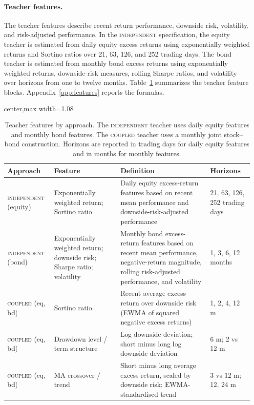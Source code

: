 \documentclass[10pt]{article}
\newcommand{\Acoup}{\textsc{coupled}}
\newcommand{\Bindep}{\textsc{independent}}
\begin{document}
\paragraph{Teacher features.}
The teacher features describe recent return performance, downside risk, volatility, and risk-adjusted performance. In the \Bindep{} specification, the equity teacher is estimated from daily equity excess returns using exponentially weighted returns and Sortino ratios over 21, 63, 126, and 252 trading days. The bond teacher is estimated from monthly bond excess returns using exponentially weighted returns, downside-risk measures, rolling Sharpe ratios, and volatility over horizons from one to twelve months. Table~\ref{tab:teacher-features} summarizes the teacher feature blocks. Appendix~\ref{app:features} reports the formulas.

\begin{table}[H]
\centering
\caption{Teacher features by approach. The \Bindep{} teacher uses daily equity features and monthly bond features. The \Acoup{} teacher uses a monthly joint stock--bond construction. Horizons are reported in trading days for daily equity features and in months for monthly features.}
\label{tab:teacher-features}
\small
\begin{adjustbox}{center,max width=1.08\textwidth}
\begin{tabular}{p{2.1cm}p{2.3cm}p{6.4cm}p{3.0cm}}
\toprule
Approach & Feature & Definition & Horizons \\
\midrule
\Bindep{} (equity) & Exponentially weighted return; Sortino ratio & Daily equity excess-return features based on recent mean performance and downside-risk-adjusted performance & 21, 63, 126, 252 trading days \\
\Bindep{} (bond) & Exponentially weighted return; downside risk; Sharpe ratio; volatility & Monthly bond excess-return features based on recent mean performance, negative-return magnitude, rolling risk-adjusted performance, and volatility & 1, 3, 6, 12 months \\
\midrule
\Acoup{} (eq, bd) & Sortino ratio & Recent average excess return over downside risk (EWMA of squared negative excess returns) & 1, 2, 4, 12 m \\
\Acoup{} (eq, bd) & Drawdown level / term structure & Log downside deviation; short minus long log downside deviation & 6 m; 2 vs 12 m \\
\Acoup{} (eq, bd) & MA crossover / trend & Short minus long average excess return, scaled by downside risk; EWMA-standardised trend & 3 vs 12 m; 12, 24 m \\
\bottomrule
\end{tabular}
\end{adjustbox}
\end{table}
\end{document}
